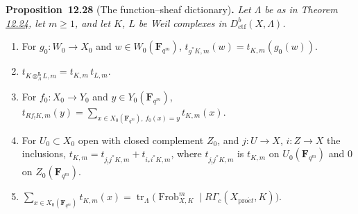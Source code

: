 \documentclass[11pt]{article}
\newenvironment{bpstatement}[2]{\par\addvspace{0.6\baselineskip}\noindent\textbf{#1}#2\textbf{.}\enspace\ignorespaces}
  {\par\addvspace{0.4\baselineskip}}
\newenvironment{bpstatementit}[2]{\begin{bpstatement}{#1}{#2}\itshape\ignorespaces}{\end{bpstatement}}
\begin{document}
\label{bp309}%
\begin{bpstatementit}{Proposition~12.28}{ (The function–sheaf dictionary)}
Let \(\Lambda\) be as in Theorem \hyperref[bp298]{12.24}, let \(m\geq1\), and let \(K\), \(L\) be Weil complexes in \(D^b_{\mathrm{ctf}}(X,\Lambda)\).

\begin{enumerate}
\item For \(g_0:W_0\to X_0\) and \(w\in W_0(\mathbf F_{q^m})\), \(t_{g^*K,m}(w)=t_{K,m}(g_0(w))\).
\item \(t_{K\otimes^{\mathbf L}_\Lambda L,m}=t_{K,m}\,t_{L,m}\).
\item For \(f_0:X_0\to Y_0\) and \(y\in Y_0(\mathbf F_{q^m})\), \(t_{Rf_!K,m}(y)=\sum_{x\in X_0(\mathbf F_{q^m}),\,f_0(x)=y}t_{K,m}(x)\).
\item For \(U_0\subset X_0\) open with closed complement \(Z_0\), and \(j:U\to X\), \(i:Z\to X\) the inclusions, \(t_{K,m}=t_{j_!j^*K,m}+t_{i_*i^*K,m}\), where \(t_{j_!j^*K,m}\) is \(t_{K,m}\) on \(U_0(\mathbf F_{q^m})\) and \(0\) on \(Z_0(\mathbf F_{q^m})\).
\item \(\sum_{x\in X_0(\mathbf F_{q^m})}t_{K,m}(x)
  =\operatorname{tr}_\Lambda\bigl(\operatorname{Frob}_{X,K}^m\mid
  R\Gamma_c(X_{\mathrm{pro}\acute{e}t},K)\bigr)\).
\end{enumerate}
\end{bpstatementit}
\end{document}
